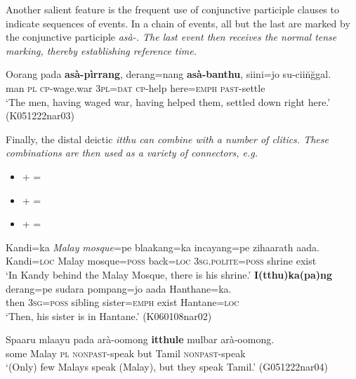 Another salient feature is the frequent use of conjunctive participle clauses to indicate sequences of events. In a chain of events, all but the last are marked by the conjunctive participle \em asà-\em. The last event then receives the normal tense marking, thereby establishing  reference time. 


\ea\label{ex:form:asa:clausechain}
\gll Oorang pada \textbf{asà-pìrrang}, derang=nang \textbf{asà-banthu}, siini=jo su-cii\u n\u ggal. \\
 man \textsc{pl} \textsc{cp}-wage.war 3\textsc{pl}=\textsc{dat} \textsc{cp}-help here=\textsc{emph} \textsc{past}-settle\\
`The men, having waged war, having helped them,  settled down right here.' (K051222nar03)
\z



Finally, the distal deictic \em itthu \em can combine with a number of clitics. These combinations are then used as a variety of connectors, e.g. 
\begin{itemize}
 \item {} +  = 
 \item {} +  =   
 \item {} +  =  
\end{itemize}



\ea\label{ex:beyond:link:ikang}
\ea 
\gll Kandi=ka {\em Malay} {\em mosque}=pe blaakang=ka incayang=pe zihaarath aada. \\ %
     Kandi=\textsc{loc} Malay mosque=\textsc{poss} back=\textsc{loc} 3\textsc{sg}.\textsc{polite}=\textsc{poss} shrine exist  \\
    `In Kandy behind the Malay Mosque, there is his shrine.' 
\ex
\gll \textbf{I(tthu)ka(pa)ng} derang=pe sudara pompang=jo aada Hanthane=ka. \\
     then 3\textsc{sg}=\textsc{poss} sibling sister=\textsc{emph} exist Hantane=\textsc{loc} \\
    `Then, his sister is in Hantane.'    (K060108nar02)
    
\z    
\z  



\ea\label{ex:beyond:link:itthule}
\gll Spaaru mlaayu pada arà-oomong \textbf{itthule} mulbar arà-oomong. \\
     some Malay \textsc{pl} \textsc{nonpast}-speak but Tamil \textsc{nonpast}-speak  \\
    `(Only) few Malays speak (Malay), but they speak Tamil.'  (G051222nar04)
\z      



\nocite{Gair1998}